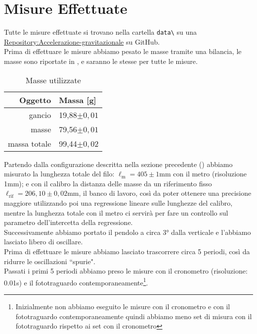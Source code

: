 \section{Misure Effettuate}\label{misure effettuate}
Tutte le misure effettuate si trovano nella cartella \verb|data\| su una  \href{https://github.com/Mattia04/Accelerazione-gravitazionale/tree/main}{Repository:Accelerazione-gravitazionale} su GitHub.\\

Prima di effettuare le misure abbiamo pesato le masse tramite una bilancia, le masse sono riportate in , e saranno le stesse per tutte le misure. 

\begin{table}[h]
    \centering
    \begin{tabular}{r|l}
        \textbf{Oggetto} & \textbf{Massa [g]} \\
        \hline gancio & 19,88$\pm 0,01$\\
        masse & 79,56$\pm 0,01$\\
        massa totale & 99,44$\pm 0,02$
    \end{tabular}
    \caption{Masse utilizzate}
    \label{tab:masse usate}
\end{table}

Partendo dalla configurazione descritta nella sezione precedente () abbiamo misurato la lunghezza totale del filo: $\ell_\text{m} = 405\pm 1$mm con il metro (risoluzione 1mm); e con il calibro  la distanza delle masse da un riferimento fisso $\ell_\text{rif} = 206,10\pm0,02$mm, il banco di lavoro, così da poter ottenere una precisione maggiore utilizzando poi una regressione lineare sulle lunghezze del calibro, mentre la lunghezza totale con il metro ci servirà per fare un controllo sul parametro dell'intercetta della regressione.\\

Successivamente abbiamo portato il pendolo a circa 3° dalla verticale e l'abbiamo lasciato libero di oscillare.\\
Prima di effettuare le misure abbiamo lasciato trascorrere circa 5 periodi, così da ridurre le oscillazioni ``spurie".\\
Passati i primi 5 periodi abbiamo preso le misure con il cronometro (risoluzione: 0.01s) e il fototraguardo contemporaneamente\footnote{Inizialmente non abbiamo eseguito le misure con il cronometro e con il fototraguardo contemporaneamente quindi abbiamo meno set di misura con il fototraguardo rispetto ai set con il cronometro}. \\

